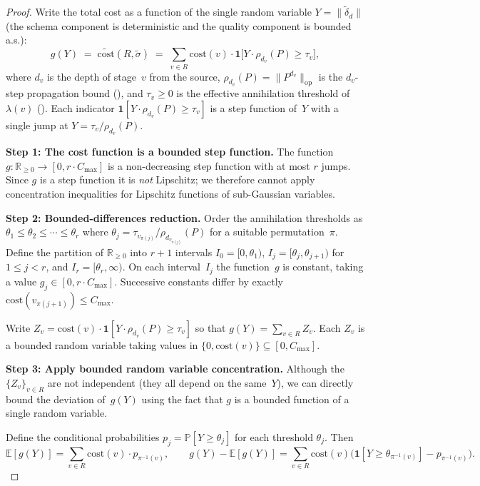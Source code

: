 \documentclass[11pt,a4paper]{article}
\theoremstyle{definition}
\newcommand{\cost}{\mathrm{cost}}
\newcommand{\bbR}{\mathbb{R}}
\newcommand{\bbP}{\mathbb{P}}
\newcommand{\bbE}{\mathbb{E}}
\begin{document}
\begin{proof}
Write the total cost as a function of the single random variable
$Y = \|\tilde{\delta}_d\|$ (the schema component is deterministic and the
quality component is bounded a.s.):
\[
  g(Y) \;=\; \widetilde{\cost}(R, \tilde{\sigma})
  \;=\; \sum_{v \in R} \cost(v) \cdot
    \mathbf{1}\bigl[Y \cdot \rho_{d_v}(P) \geq \tau_v\bigr],
\]
where $d_v$ is the depth of stage~$v$ from the source,
$\rho_{d_v}(P) = \|P^{d_v}\|_{\mathrm{op}}$ is the $d_v$-step propagation
bound (), and $\tau_v \geq 0$ is the effective
annihilation threshold of $\lambda(v)$ ().
Each indicator $\mathbf{1}[Y \cdot \rho_{d_v}(P) \geq \tau_v]$ is a step
function of~$Y$ with a single jump at $Y = \tau_v / \rho_{d_v}(P)$.

\textbf{Step 1: The cost function is a bounded step function.}
The function $g\colon \bbR_{\geq 0} \to [0, r \cdot C_{\max}]$ is a
non-decreasing step function with at most $r$ jumps.  Since $g$ is a step
function it is \emph{not} Lipschitz; we therefore cannot apply concentration
inequalities for Lipschitz functions of sub-Gaussian variables.

\textbf{Step 2: Bounded-differences reduction.}
Order the annihilation thresholds as
$\theta_1 \leq \theta_2 \leq \cdots \leq \theta_r$ where
$\theta_j = \tau_{v_{\pi(j)}} / \rho_{d_{v_{\pi(j)}}}(P)$ for a suitable
permutation~$\pi$.  Define the partition of $\bbR_{\geq 0}$ into $r+1$
intervals $I_0 = [0, \theta_1)$, $I_j = [\theta_j, \theta_{j+1})$ for
$1 \leq j < r$, and $I_r = [\theta_r, \infty)$.  On each interval~$I_j$
the function~$g$ is constant, taking a value $g_j \in [0, r \cdot C_{\max}]$.
Successive constants differ by exactly $\cost(v_{\pi(j+1)}) \leq C_{\max}$.

Write $Z_v = \cost(v) \cdot \mathbf{1}[Y \cdot \rho_{d_v}(P) \geq \tau_v]$
so that $g(Y) = \sum_{v \in R} Z_v$.  Each $Z_v$ is a bounded random variable
taking values in $\{0, \cost(v)\} \subseteq [0, C_{\max}]$.

\textbf{Step 3: Apply bounded random variable concentration.}
Although the $\{Z_v\}_{v \in R}$ are not independent (they all depend on the
same~$Y$), we can directly bound the deviation of~$g(Y)$ using the fact that
$g$ is a bounded function of a single random variable.

Define the conditional probabilities $p_j = \bbP[Y \geq \theta_j]$ for each
threshold $\theta_j$.  Then
\[
  \bbE[g(Y)] = \sum_{v \in R} \cost(v) \cdot p_{\pi^{-1}(v)},
  \qquad
  g(Y) - \bbE[g(Y)]
  = \sum_{v \in R} \cost(v)\bigl(\mathbf{1}[Y \geq \theta_{\pi^{-1}(v)}]
    - p_{\pi^{-1}(v)}\bigr).
\]


\end{proof}
\end{document}
